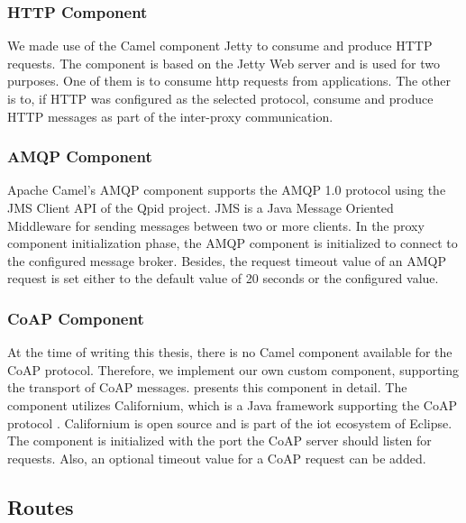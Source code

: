 \subsubsection{HTTP Component}

We made use of the Camel component Jetty to consume and produce HTTP
requests. The component is based on the Jetty Web server\cite{jetty-homepage}
and is used for two purposes. One of them is to consume \gls{http} requests from
applications. The other is to, if HTTP was configured as the selected protocol,
consume and produce HTTP messages as part of the inter-proxy communication.

\subsubsection{AMQP Component}

Apache Camel's AMQP component supports the AMQP 1.0 protocol using the JMS
Client API of the Qpid project. JMS is a Java Message Oriented Middleware for
sending messages between two or more clients. In the proxy component
initialization phase, the AMQP component is initialized to connect to the
configured message broker. Besides, the request timeout value of an AMQP request
is set either to the default value of 20 seconds or the configured value.

\subsubsection{CoAP Component}

At the time of writing this thesis, there is no Camel component available for
the CoAP protocol. Therefore, we implement our own custom component, supporting
the transport of CoAP messages.  presents this
component in detail. The component utilizes Californium, which is a Java
framework supporting the CoAP protocol \cite{californium-homepage}. Californium
is open source and is part of the \gls{iot} ecosystem of Eclipse. The component
is initialized with the port the CoAP server should listen for requests. Also,
an optional timeout value for a CoAP request can be added.

\subsection{Routes}

